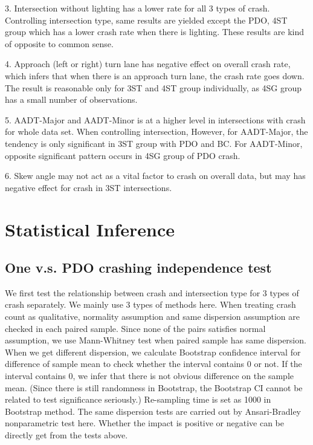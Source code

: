 \documentclass[11pt]{scrartcl} %
\begin{document}
3. Intersection without lighting has a lower rate for all 3 types of crash. Controlling intersection type, same results are yielded except the PDO, 4ST group which has a lower crash rate when there is lighting. These results are kind of opposite to common sense.

4. Approach (left or right) turn lane has negative effect on overall crash rate, which infers that when there is an approach turn lane, the crash rate goes down. The result is reasonable only for 3ST and 4ST group individually, as 4SG group has a small number of observations.

5. AADT-Major and AADT-Minor is at a higher level in intersections with crash for whole data set. When controlling intersection, However, for AADT-Major, the tendency is only significant in 3ST group with PDO and BC. For AADT-Minor, opposite significant pattern occurs in 4SG group of PDO crash.

6. Skew angle may not act as a vital factor to crash on overall data, but may has negative effect for crash in 3ST intersections.

\section{Statistical Inference}

\subsection{One v.s. PDO crashing independence test}

We first test the relationship between crash and intersection type for 3 types of crash separately. We mainly use 3 types of methods here. When treating crash count as qualitative, normality assumption and same dispersion assumption are checked in each paired sample. Since none of the pairs satisfies normal assumption, we use Mann-Whitney test when paired sample has same dispersion. When we get different dispersion, we calculate Bootstrap confidence interval for difference of sample mean to check whether the interval contains 0 or not. If the interval contains 0, we infer that there is not obvious difference on the sample mean. (Since there is still randomness in Bootstrap, the Bootstrap CI cannot be related to test significance seriously.) Re-sampling time is set as 1000 in Bootstrap method. The same dispersion tests are carried out by Ansari-Bradley nonparametric test here. Whether the impact is positive or negative can be directly get from the tests above.
\end{document}
